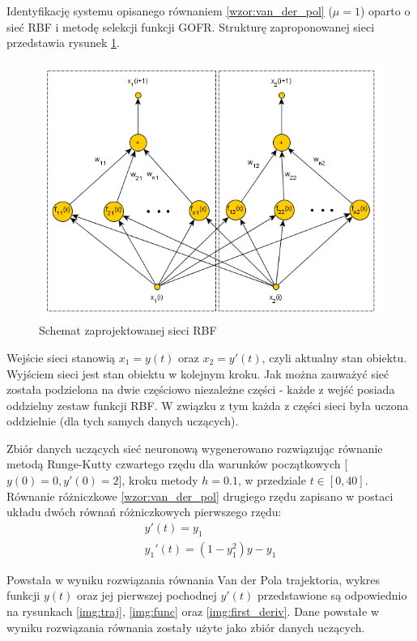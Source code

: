 Identyfikację systemu opisanego równaniem \ref{wzor:van_der_pol} ($\mu = 1$) oparto o sieć RBF i metodę selekcji funkcji GOFR. Strukturę zaproponowanej sieci przedstawia rysunek \ref{fig:rbf}.
\begin{figure}[ht!]
	\centering
	
	\includegraphics[width = \textwidth]{images/rbf.png}
	\caption{Schemat zaprojektowanej sieci RBF}
	\label{fig:rbf}	

\end{figure}
Wejście sieci stanowią $x_1 = y(t)$ oraz $x_2 = y'(t)$, czyli aktualny stan obiektu. Wyjściem sieci jest stan obiektu w kolejnym kroku. Jak można zauważyć sieć została podzielona na dwie częściowo niezależne części - każde z wejść posiada oddzielny zestaw funkcji RBF. W związku z tym każda z części sieci była uczona oddzielnie (dla tych samych danych uczących). 

Zbiór danych uczących sieć neuronową wygenerowano rozwiązując równanie metodą Runge-Kutty czwartego rzędu dla warunków początkowych [$y(0)=0,y'(0)=2$], kroku metody $h=0.1$, w przedziale $t \in [0,40]$. Równanie różniczkowe \ref{wzor:van_der_pol} drugiego rzędu zapisano w postaci układu dwóch równań różniczkowych pierwszego rzędu:
\begin{equation}
	\begin{array}{l}
    y'(t)  = y_1 \\
    y_1'(t) = (1-y_1^2)y-y_1
    \end{array}
\end{equation}

Powstała w wyniku rozwiązania równania Van der Pola trajektoria, wykres funkcji $y(t)$ oraz jej pierwszej pochodnej $y'(t)$ przedstawione są odpowiednio na rysunkach \ref{img:traj}, \ref{img:func} oraz \ref{img:first_deriv}. Dane powstałe w wyniku rozwiązania równania zostały użyte jako zbiór danych uczących.

